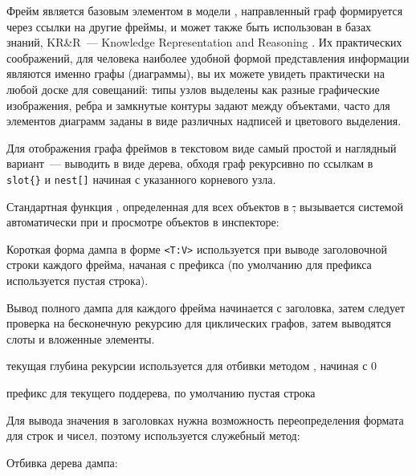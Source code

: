 Фрейм является базовым элементом в модели \met, направленный граф формируется через ссылки на другие фреймы,
и может также быть использован в базах знаний, KR\&R\ --- Knowledge Rep\-resen\-tation and Rea\-so\-ning \cite{minsky}.
Их практических соображений, для человека наиболее удобной формой представления информации являются именно графы (диаграммы),
вы их можете увидеть практически на любой доске для совещаний: типы узлов выделены как разные графические изображения,
ребра и замкнутые контуры задают  между объектами, часто для элементов диаграмм заданы  в виде
различных надписей и цветового выделения.

\clearpage
{}\label{dump}

Для отображения графа фреймов в текстовом виде самый простой и наглядный вариант\ --- выводить
 в виде дерева, обходя граф рекурсивно по ссылкам в \verb|slot{}| и \verb|nest[]| начиная
с указанного корневого узла.


Стандартная функция , определенная для всех объектов в \st, вызывается системой
автоматически при  и просмотре объектов в инспекторе:



Короткая форма дампа в форме \verb|<T:V>| используется при выводе заголовочной строки
каждого фрейма, начаная с префикса (по умолчанию для префикса используется пустая строка).


Вывод полного дампа для каждого фрейма начинается с заголовка, затем следует проверка на бесконечную
рекурсию для циклических графов, затем выводятся слоты и вложенные элементы.

\begin{description}[nosep]
    \item{\emph{}} текущая глубина рекурсии используется для отбивки методом , начиная с 0
    \item{\emph{}} префикс для текущего поддерева, по умолчанию пустая строка
\end{description}


Для вывода значения  в заголовках нужна возможность переопределения формата для строк и чисел,
поэтому используется служебный метод:


Отбивка дерева дампа:



\secup
